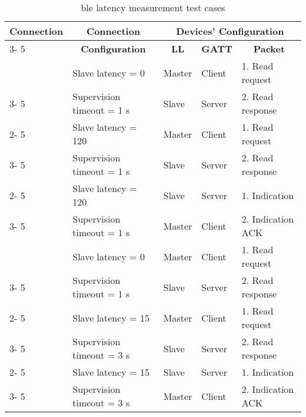 \begin{table}[htbp]
\begin{center}
\begin{tabular}{|l|l|l|l|l|}
\hline
\multicolumn{ 1}{|c|}{\textbf{Connection}} & \multicolumn{ 1}{c|}{\textbf{Connection}} & \multicolumn{ 3}{c|}{\textbf{Devices' Configuration}} \\ \cline{ 3- 5}
\multicolumn{ 1}{|c|}{\textbf{Interval}} & \multicolumn{ 1}{c|}{\textbf{Configuration}} & \multicolumn{ 1}{c}{\textbf{LL}} & \multicolumn{ 1}{|c}{\textbf{GATT}} & \multicolumn{ 1}{|c|}{\textbf{Packet}} \\ \hline
\multicolumn{ 1}{|c|}{} & \multicolumn{ 1}{l|}{Slave latency = 0} & Master & Client & 1. Read request \\ \cline{ 3- 5}
\multicolumn{ 1}{|l|}{} & \multicolumn{ 1}{l|}{
Supervision timeout = 1 \si{\second}} & Slave & Server & 2. Read response \\ \cline{ 2- 5}
\multicolumn{ 1}{|c|}{7.5 \si{\milli\second}} & \multicolumn{ 1}{l|}{Slave latency = 120
} & Master & Client & 1. Read request \\ \cline{ 3- 5}
\multicolumn{ 1}{|l|}{} & \multicolumn{ 1}{l|}{Supervision timeout = 1 \si{\second}} & Slave & Server & 2. Read response \\ \cline{ 2- 5}
\multicolumn{ 1}{|l|}{} & \multicolumn{ 1}{l|}{Slave latency = 120
} & Slave & Server & 1. Indication \\ \cline{ 3- 5}
\multicolumn{ 1}{|l|}{} & \multicolumn{ 1}{l|}{Supervision timeout = 1 \si{\second}} & Master & Client & 2. Indication ACK \\ \hline
\multicolumn{ 1}{|c|}{} & \multicolumn{ 1}{l|}{Slave latency = 0
} & Master & Client & 1. Read request \\ \cline{ 3- 5}
\multicolumn{ 1}{|l|}{} & \multicolumn{ 1}{l|}{Supervision timeout = 1 \si{\second}} & Slave & Server & 2. Read response \\ \cline{ 2- 5}
\multicolumn{ 1}{|c|}{125 \si{\milli\second}} & \multicolumn{ 1}{l|}{Slave latency = 15
} & Master & Client & 1. Read request \\ \cline{ 3- 5}
\multicolumn{ 1}{|l|}{} & \multicolumn{ 1}{l|}{Supervision timeout = 3 \si{\second}} & Slave & Server & 2. Read response \\ \cline{ 2- 5}
\multicolumn{ 1}{|l|}{} & \multicolumn{ 1}{l|}{Slave latency = 15
} & Slave & Server & 1. Indication \\ \cline{ 3- 5}
\multicolumn{ 1}{|l|}{} & \multicolumn{ 1}{l|}{Supervision timeout = 3 \si{\second}} & Master & Client & 2. Indication ACK \\ \hline
\end{tabular}
\end{center}
\caption{\gls{ble} latency measurement test cases}
\label{tbl:testcases}
\end{table}

